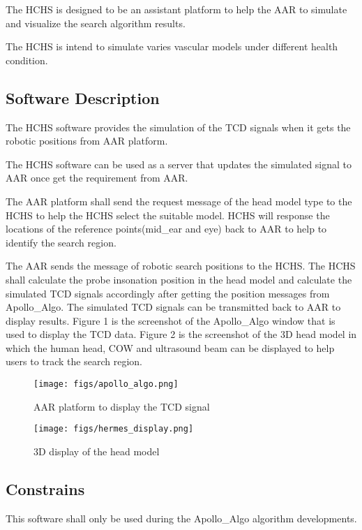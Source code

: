 \documentclass[10pt]{article}
\begin{document}
  The HCHS is designed to be an assistant platform to help the AAR to simulate and visualize the search algorithm results.
  
  The HCHS is intend to simulate varies vascular models under different health condition.
 \subsection {Software Description}
  The HCHS software provides the simulation of the TCD signals when it gets the robotic positions from AAR platform. 
  
  The HCHS software can be used as a server that updates the simulated signal to AAR once get the requirement from AAR.
  
  The AAR platform shall send the request message of the head model type to the HCHS to help the HCHS select the suitable model. HCHS will response the locations of the reference points(mid\_ear and eye) back to AAR to help to identify the search region.
  
  The AAR sends the message of robotic search positions to the HCHS. The HCHS shall calculate the probe insonation position in the head model and calculate the simulated TCD signals accordingly after getting the position messages from Apollo\_Algo. The simulated TCD signals can be transmitted back to AAR to display results. Figure 1 is the screenshot of the Apollo\_Algo window that is used to display the TCD data. Figure 2 is the screenshot of the 3D head model in which the human head, COW and ultrasound beam can be displayed to help users to track the search region. 

    \begin{figure}
        \centering
        \texttt{[image: figs/apollo\_algo.png]}
        \caption{AAR platform to display the TCD signal}
    \end{figure}
    \begin{figure}
        \centering
        \texttt{[image: figs/hermes\_display.png]}
        \caption{3D display of the head model}
    \end{figure}
  
  \subsection{Constrains}
  This software shall only be used during the Apollo\_Algo algorithm developments. 
\end{document}
